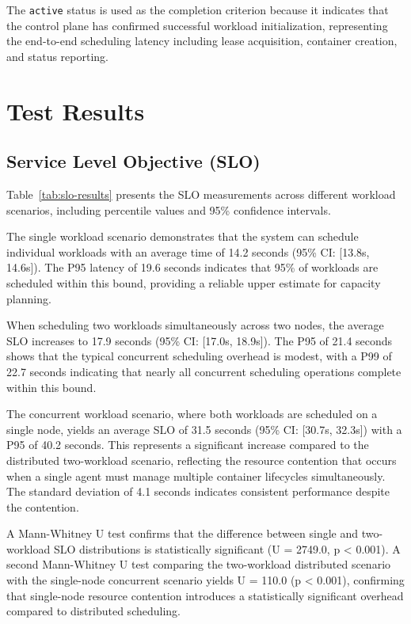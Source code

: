 The \texttt{active} status is used as the completion criterion because it indicates that the control plane has confirmed successful workload initialization, representing the end-to-end scheduling latency including lease acquisition, container creation, and status reporting.

\section{Test Results}

\subsection{Service Level Objective (SLO)}

Table~\ref{tab:slo-results} presents the SLO measurements across different workload scenarios, including percentile values and 95\% confidence intervals.

\begin{table}[h]
\centering
\caption{Service Level Objective (SLO) measurements with confidence intervals and percentiles}
\label{tab:slo-results}
\end{table}

The single workload scenario demonstrates that the system can schedule individual workloads with an average time of 14.2 seconds (95\% CI: [13.8s, 14.6s]). The P95 latency of 19.6 seconds indicates that 95\% of workloads are scheduled within this bound, providing a reliable upper estimate for capacity planning.

When scheduling two workloads simultaneously across two nodes, the average SLO increases to 17.9 seconds (95\% CI: [17.0s, 18.9s]). The P95 of 21.4 seconds shows that the typical concurrent scheduling overhead is modest, with a P99 of 22.7 seconds indicating that nearly all concurrent scheduling operations complete within this bound.

The concurrent workload scenario, where both workloads are scheduled on a single node, yields an average SLO of 31.5 seconds (95\% CI: [30.7s, 32.3s]) with a P95 of 40.2 seconds. This represents a significant increase compared to the distributed two-workload scenario, reflecting the resource contention that occurs when a single agent must manage multiple container lifecycles simultaneously. The standard deviation of 4.1 seconds indicates consistent performance despite the contention.

A Mann-Whitney U test confirms that the difference between single and two-workload SLO distributions is statistically significant (U = 2749.0, p < 0.001). A second Mann-Whitney U test comparing the two-workload distributed scenario with the single-node concurrent scenario yields U = 110.0 (p < 0.001), confirming that single-node resource contention introduces a statistically significant overhead compared to distributed scheduling.

